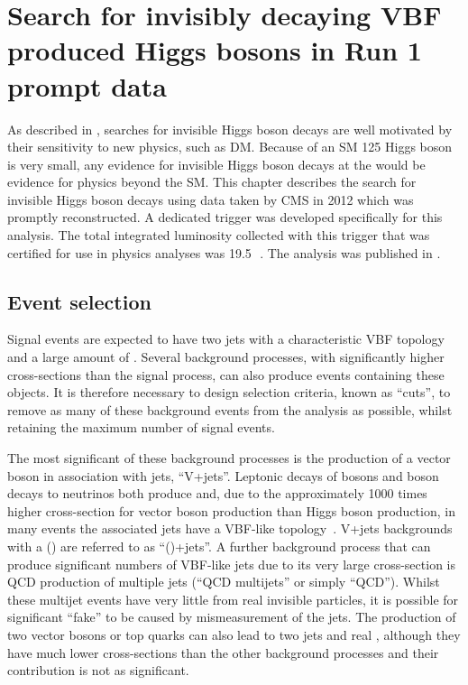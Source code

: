 \chapter{Search for invisibly decaying VBF produced Higgs bosons in Run 1 prompt data}
\label{chap:prompt}
As described in , searches for invisible Higgs boson decays are well motivated by their sensitivity to new physics, such as \ac{DM}. Because \BRinv of an \ac{SM} 125 \GeV Higgs boson is very small, any evidence for invisible Higgs boson decays at the \LHC would be evidence for physics beyond the \ac{SM}. This chapter describes the search for invisible Higgs boson decays using data taken by CMS in 2012 which was promptly reconstructed. A dedicated trigger was developed specifically for this analysis. The total integrated luminosity collected with this trigger that was certified for use in physics analyses was 19.5\,\invfb~\cite{CMS-PAS-LUM-13-001}. The analysis was published in .

\section{Event selection}
\label{sec:promptsel}
Signal events are expected to have two jets with a characteristic \ac{VBF} topology and a large amount of \MET. Several background processes, with significantly higher cross-sections than the signal process, can also produce events containing these objects. It is therefore necessary to design selection criteria, known as ``cuts'', to remove as many of these background events from the analysis as possible, whilst retaining the maximum number of signal events.

The most significant of these background processes is the production of a vector boson in association with jets, ``V+jets''. Leptonic decays of \PW bosons and \PZ boson decays to neutrinos both produce \MET and, due to the approximately 1000 times higher cross-section for vector boson production than Higgs boson production, in many events the associated jets have a \ac{VBF}-like topology~\cite{CMSSMPPublic}. V+jets backgrounds with a \PW (\PZ) are referred to as ``\PW(\PZ)+jets''.
A further background process that can produce significant numbers of \ac{VBF}-like jets due to its very large cross-section is \ac{QCD} production of multiple jets (``\ac{QCD} multijets'' or simply ``\ac{QCD}''). Whilst these multijet events have very little \MET from real invisible particles, it is possible for significant ``fake'' \MET to be caused by mismeasurement of the jets. The production of two vector bosons or top quarks can also lead to two jets and real \MET, although they have much lower cross-sections than the other background processes and their contribution is not as significant. %

